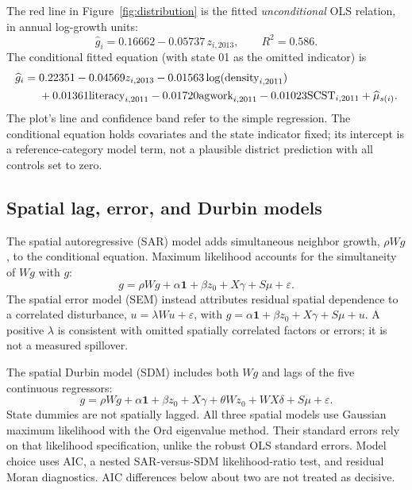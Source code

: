 \documentclass[11pt,a4paper]{article}
\begin{document}
The red line in Figure~\ref{fig:distribution} is the fitted \emph{unconditional} OLS relation, in annual log-growth units:
\begin{equation}
\widehat g_i=0.16662-0.05737\,z_{i,2013},\qquad R^2=0.586.
\end{equation}
The conditional fitted equation (with state 01 as the omitted indicator) is
\begin{align}
\widehat g_i={}&0.22351-0.04569z_{i,2013}-0.01563\log(\text{density}_{i,2011})\notag\\
&+0.01361\text{literacy}_{i,2011}-0.01720\text{agwork}_{i,2011}
-0.01023\text{SCST}_{i,2011}+\widehat\mu_{s(i)}.
\end{align}
The plot's line and confidence band refer to the simple regression. The conditional equation holds covariates and the state indicator fixed; its intercept is a reference-category model term, not a plausible district prediction with all controls set to zero.

\subsection{Spatial lag, error, and Durbin models}
The spatial autoregressive (SAR) model adds simultaneous neighbor growth, $\rho Wg$, to the conditional equation. Maximum likelihood accounts for the simultaneity of $Wg$ with $g$:
\begin{equation}
g=\rho Wg+\alpha\mathbf{1}+\beta z_0+X\gamma+S\mu+\varepsilon.
\end{equation}
The spatial error model (SEM) instead attributes residual spatial dependence to a correlated disturbance, $u=\lambda Wu+\varepsilon$, with $g=\alpha\mathbf{1}+\beta z_0+X\gamma+S\mu+u$. A positive $\lambda$ is consistent with omitted spatially correlated factors or errors; it is not a measured spillover.

The spatial Durbin model (SDM) includes both $Wg$ and lags of the five continuous regressors:
\begin{equation}
g=\rho Wg+\alpha\mathbf{1}+\beta z_0+X\gamma+\theta Wz_0+WX\delta+S\mu+\varepsilon.
\end{equation}
State dummies are not spatially lagged. All three spatial models use Gaussian maximum likelihood with the Ord eigenvalue method. Their standard errors rely on that likelihood specification, unlike the robust OLS standard errors. Model choice uses AIC, a nested SAR-versus-SDM likelihood-ratio test, and residual Moran diagnostics. AIC differences below about two are not treated as decisive.
\end{document}
